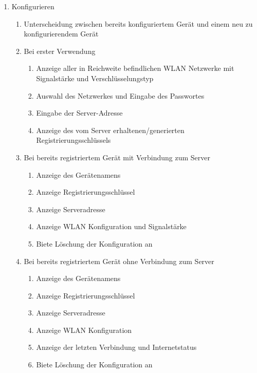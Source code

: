 \documentclass[pointlessnumbers]{scrartcl}
\begin{document}
\begin{enumerate}
  \item Konfigurieren 
  \begin{enumerate}
    \item Unterscheidung zwischen bereits konfiguriertem Gerät und einem neu zu konfigurierendem Gerät 
    \item Bei erster Verwendung 
        \begin{enumerate}
            \item Anzeige aller in Reichweite befindlichen WLAN Netzwerke mit Signalstärke und Verschlüsselungstyp 
            \item Auswahl des Netzwerkes und Eingabe des Passwortes 
            \item Eingabe der Server-Adresse 
            \item Anzeige des vom Server erhaltenen/generierten Registrierungsschlüssels 
        \end{enumerate}
    \item Bei bereits registriertem Gerät mit Verbindung zum Server 
        \begin{enumerate}
            \item Anzeige des Gerätenamens 
            \item Anzeige Registrierungsschlüssel 
            \item Anzeige Serveradresse 
            \item Anzeige WLAN Konfiguration und Signalstärke 
            \item Biete Löschung der Konfiguration an 
        \end{enumerate}  
    \item Bei bereits registriertem Gerät ohne Verbindung zum Server
        \begin{enumerate}
            \item Anzeige des Gerätenamens
            \item Anzeige Registrierungsschlüssel 
            \item Anzeige Serveradresse 
            \item Anzeige WLAN Konfiguration 
            \item Anzeige der letzten Verbindung und Internetstatus 
            \item Biete Löschung der Konfiguration an 
        \end{enumerate}        
    \end{enumerate}
        

\end{enumerate}
\end{document}
